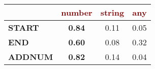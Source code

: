 \renewcommand{\arraystretch}{0.5}
\scriptsize
\begin{tabular}{@{}l c@{\hskip 1mm} c@{\hskip 1mm} c@{}}
\toprule
& \textbf{\textcolor{Maroon}{number}} & \textbf{\textcolor{Maroon}{string}} & \textbf{\textcolor{Maroon}{any}}\\ 
\midrule
\textbf{\textcolor{mygreen}{START}} & \textbf{0.84} & 0.11 & 0.05\\
\textbf{\textcolor{mygreen}{END}} & \textbf{0.60} & 0.08 & 0.32\\
\textbf{\textcolor{mygreen}{ADDNUM}} & \textbf{0.82} & 0.14 & 0.04\\
\bottomrule
\end{tabular}
